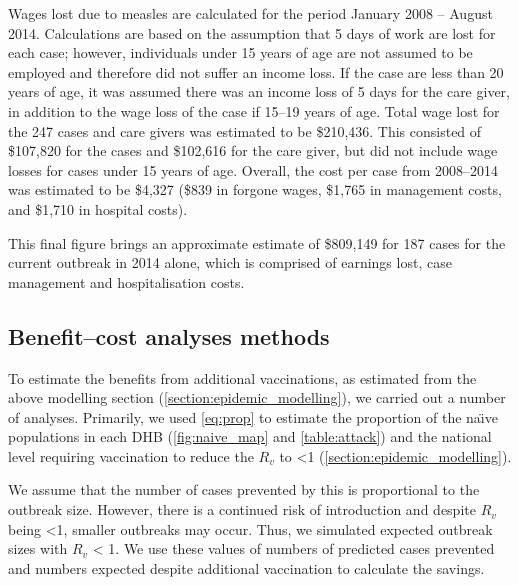 \documentclass{article}
\begin{document}
Wages lost due to measles are calculated for the period January 2008 -- August 2014. Calculations are based on the assumption that 5 days of work are lost for each case; however, individuals under 15 years of age are not assumed to be employed and therefore did not suffer an income loss. If the case are less than 20 years of age, it was assumed there was an income loss of 5 days for the care giver, in addition to the wage loss of the case if 15--19 years of age. Total wage lost for the 247 cases and care givers was estimated to be \$210,436. This consisted of \$107,820 for the cases and \$102,616 for the care giver, but did not include wage losses for cases under 15 years of age. Overall, the cost per case from 2008--2014 was estimated to be \$4,327 (\$839 in forgone wages, \$1,765 in management costs, and \$1,710 in hospital costs).

This final figure brings an approximate estimate of \$809,149 for 187 cases for the current outbreak in 2014 alone, which is comprised of earnings lost, case management and hospitalisation costs.

\subsection{Benefit--cost analyses methods}
\label{sub:cost_benefit}

To estimate the benefits from additional vaccinations, as estimated from the above modelling section (\autoref{section:epidemic_modelling}), we carried out a number of analyses. Primarily, we used \autoref{eq:prop} to estimate the proportion of the na\"{\i}ve populations in each DHB (\autoref{fig:naive_map} and \autoref{table:attack}) and the national level requiring vaccination to reduce the $R_v$ to <1 (\autoref{section:epidemic_modelling}). 

We assume that the number of cases prevented by this is proportional to the outbreak size. However, there is a continued risk of introduction and despite $R_v$ being <1, smaller outbreaks may occur. Thus, we simulated expected outbreak sizes with $R_v$ < 1. We use these values of numbers of predicted cases prevented and numbers expected despite additional vaccination to calculate the savings. 
\end{document}
